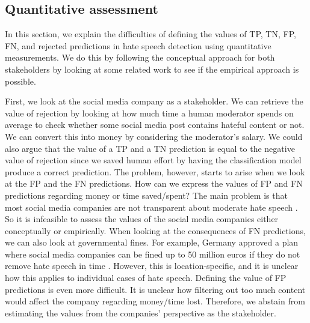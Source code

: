 \subsection{Quantitative assessment}
\label{sec:quantitative-assessment}
%
%
%
%
%
%
%
%
%
%
%
%

In this section, we explain the difficulties of defining the values of TP, TN, FP, FN, and rejected predictions in hate speech detection using quantitative measurements.
%
We do this by following the conceptual approach for both stakeholders by looking at some related work to see if the empirical approach is possible.
%

First, we look at the social media company as a stakeholder.
%
We can retrieve the value of rejection by looking at how much time a human moderator spends on average to check whether some social media post contains hateful content or not.
%
We can convert this into money by considering the moderator's salary.
%
We could also argue that the value of a TP and a TN prediction is equal to the negative value of rejection since we saved human effort by having the classification model produce a correct prediction.
%
The problem, however, starts to arise when we look at the FP and the FN predictions.
%
How can we express the values of FP and FN predictions regarding money or time saved/spent?
%
The main problem is that most social media companies are not transparent about moderate hate speech  \citep{klonick2017new}.
%
So it is infeasible to assess the values of the social media companies either conceptually or empirically.
%
When looking at the consequences of FN predictions, we can also look at governmental fines.
%
For example, Germany approved a plan where social media companies can be fined up to 50 million euros if they do not remove hate speech in time \citep{bbc-firms-face-fine-germany}.
%
However, this is location-specific, and it is unclear how this applies to individual cases of hate speech.
%
Defining the value of FP predictions is even more difficult.
%
It is unclear how filtering out too much content would affect the company regarding money/time lost.
%
Therefore, we abstain from estimating the values from the companies' perspective as the stakeholder.

